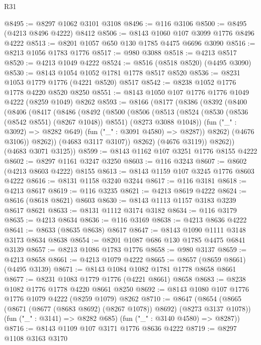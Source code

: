 \begin{lexlean}{R31}
\begin{coremodule}
@8495 := @8297 @1062 @3101 @3108
@8496 := @116 @3106
@8500 := @8495 (@4213 @8496 @4222) @8412
@8506 := @8143 @1060 @107 @3099 @1776 @8496 @4222
@8513 := @8201 @1057 @650 @130 @1785 @4475 @6696 @3090
@8516 := @8213 @1056 @1783 @1776
@8517 := @980 @3088
@8518 := @4213 @8517
@8520 := @4213 @1049 @4222
@8524 := @8516 (@8518 @8520) (@4495 @3090)
@8530 := @8143 @1054 @1052 @1781 @1778 @8517 @8520
@8536 := @8231 @1053 @1779 @1776 (@4221 @8520) @8517
@8542 := @8238 @1052 @1776 @1778 @4220 @8520 @8250
@8551 := @8143 @1050 @107 @1776 @1776 @1049 @4222 (@8259 @1049) @8262
@8593 := @8166
    (@8177
      (@8386
        (@8392
          (@8400
            (@8406
              (@8417
                (@8486
                  (@8492
                    (@8500
                      (@8506
                        (@8513
                          (@8524
                            (@8530 (@8536 (@8542 @8551) (@8267 @1048)) @8551)
                            (@8273 @3088 @1048))
                          (fun ("_" : @3092) => @8282 @649)
                          (fun ("_" : @3091 @4580) => @8287))
                        @8262)
                      (@4676 @3106))
                    @8262))
                (@4683 @3117 @3107))
              @8262)
            (@4676 @3119))
          @8262))
      (@4683 @3071 @3125))
@8599 := @8143 @1162 @107 @3251 @1776 @8155 @4222
@8602 := @8297 @1161 @3247 @3250
@8603 := @116 @3243
@8607 := @8602 (@4213 @8603 @4222) @8155
@8613 := @8143 @1159 @107 @3245 @1776 @8603 @4222
@8616 := @8131 @1158 @3240 @3244
@8617 := @116 @3181
@8618 := @4213 @8617
@8619 := @116 @3235
@8621 := @4213 @8619 @4222
@8624 := @8616 (@8618 @8621) @8603
@8630 := @8143 @1113 @1157 @3183 @3239 @8617 @8621
@8633 := @8131 @1112 @3174 @3182
@8634 := @116 @3179
@8635 := @4213 @8634
@8636 := @116 @3169
@8638 := @4213 @8636 @4222
@8641 := @8633 (@8635 @8638) @8617
@8647 := @8143 @1090 @1111 @3148 @3173 @8634 @8638
@8654 := @8201 @1087 @686 @130 @1785 @4475 @6841 @3139
@8657 := @8213 @1086 @1783 @1776
@8658 := @980 @3137
@8659 := @4213 @8658
@8661 := @4213 @1079 @4222
@8665 := @8657 (@8659 @8661) (@4495 @3139)
@8671 := @8143 @1084 @1082 @1781 @1778 @8658 @8661
@8677 := @8231 @1083 @1779 @1776 (@4221 @8661) @8658
@8683 := @8238 @1082 @1776 @1778 @4220 @8661 @8250
@8692 := @8143 @1080 @107 @1776 @1776 @1079 @4222 (@8259 @1079) @8262
@8710 := @8647
    (@8654
      (@8665 (@8671 (@8677 (@8683 @8692) (@8267 @1078)) @8692) (@8273 @3137 @1078))
      (fun ("_" : @3141) => @8282 @685)
      (fun ("_" : @3140 @4580) => @8287))
@8716 := @8143 @1109 @107 @3171 @1776 @8636 @4222
@8719 := @8297 @1108 @3163 @3170

\end{coremodule}
\end{lexlean}
